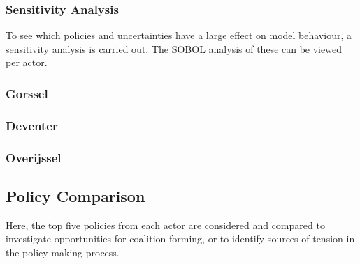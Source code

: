 \subsubsection{Sensitivity Analysis}

To see which policies and uncertainties have a large effect on model behaviour, a sensitivity analysis is carried out. The SOBOL analysis of these can be viewed per actor. 

\subsubsection{Gorssel}
\subsubsection{Deventer}
\subsubsection{Overijssel}


\subsection{Policy Comparison}
Here, the top five policies from each actor are considered and compared to investigate opportunities for coalition forming, or to identify sources of tension in the policy-making process.